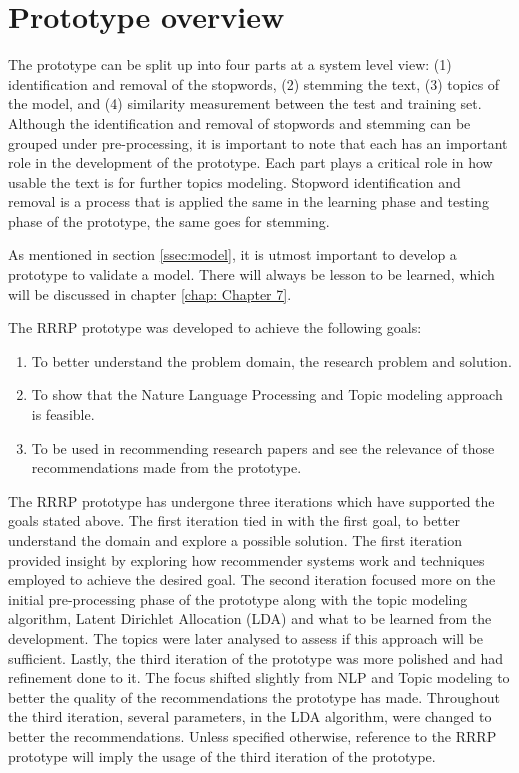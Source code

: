 \section{Prototype overview}
The prototype can be split up into four parts at a system level view: (1) identification and removal of the stopwords, (2) stemming the text, (3) topics of the model, and (4) similarity measurement between the test and training set. Although the identification and removal of stopwords and stemming can be grouped under pre-processing, it is important to note that each has an important role in the development of the prototype. Each part plays a critical role in how usable the text is for further topics modeling. Stopword identification and removal is a process that is applied the same in the learning phase and testing phase of the prototype, the same goes for stemming.

As mentioned in section \ref{ssec:model}, it is utmost important to develop a prototype to validate a model. There will always be lesson to be learned, which will be discussed in chapter \ref{chap: Chapter 7}.

The RRRP prototype was developed to achieve the following goals:
\begin{enumerate}
    \item To better understand the problem domain, the research problem and solution.
    \item To show that the Nature Language Processing and Topic modeling approach is feasible.
    \item To be used in recommending research papers and see the relevance of those recommendations made from the prototype.
\end{enumerate}
The RRRP prototype has undergone three iterations which have supported the goals stated above. The first iteration tied in with the first goal, to better understand the domain and explore a possible solution. The first iteration provided insight by exploring how recommender systems work and techniques employed to achieve the desired goal. The second iteration focused more on the initial pre-processing phase of the prototype along with the topic modeling algorithm, Latent Dirichlet Allocation (LDA) and what to be learned from the development. The topics were later analysed to assess if this approach will be sufficient. Lastly, the third iteration of the prototype was more polished and had refinement done to it. The focus shifted slightly from NLP and Topic modeling to better the quality of the recommendations the prototype has made. Throughout the third iteration, several parameters, in the LDA algorithm, were changed to better the recommendations. Unless specified otherwise, reference to the RRRP prototype will imply the usage of the third iteration of the prototype. 

